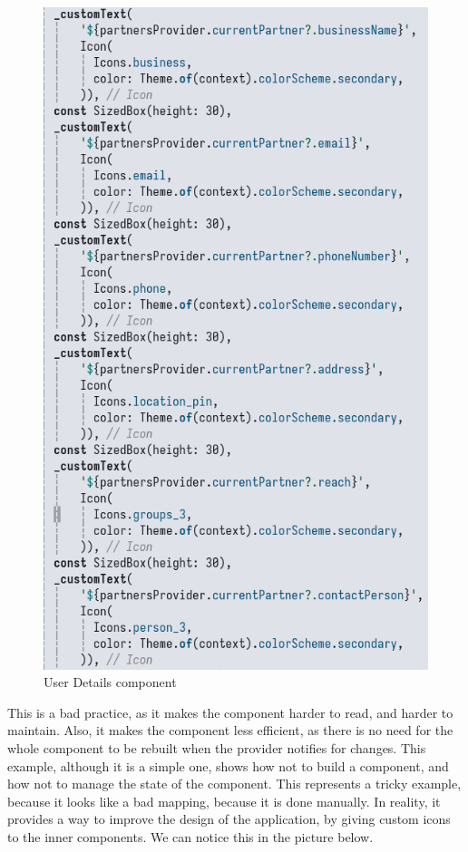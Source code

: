 \begin{figure}[htbp]
    \centering
    \includegraphics[scale=0.4]{pictures/partners_not_mapped_bad_example.png}
    \caption{User Details component}
    \label{userDetailsComponent}
\end{figure}

This is a bad practice, as it makes the component harder to read, and harder to maintain.
Also, it makes the component less efficient, as there is no need for the whole component to be rebuilt when the provider notifies for changes.
This example, although it is a simple one, shows how not to build a component, and how not to manage the state of the component.
This represents a tricky example, because it looks like a bad mapping, because it is done manually.
In reality, it provides a way to improve the design of the application, by giving custom icons to the inner components.
We can notice this in the picture below.

